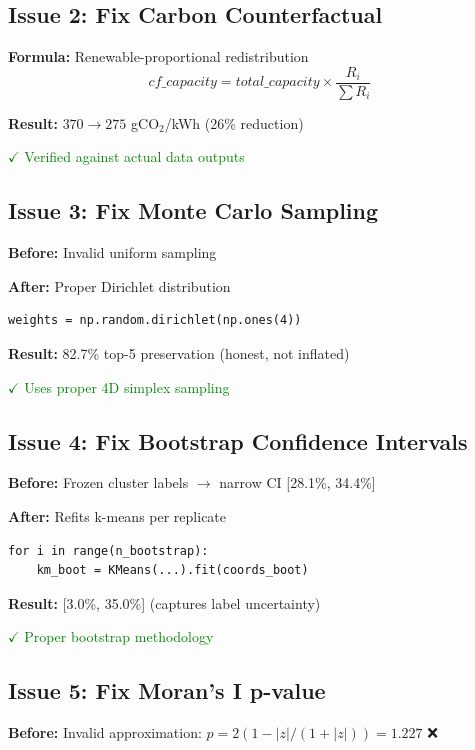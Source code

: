 \documentclass[11pt,a4paper]{article}
\begin{document}
\subsection{Issue 2: Fix Carbon Counterfactual}

\textbf{Formula:} Renewable-proportional redistribution
\[
cf\_capacity = total\_capacity \times \frac{R_i}{\sum R_i}
\]

\textbf{Result:} $370 \to 275$ gCO$_2$/kWh (26\% reduction)

\textcolor{green}{$\checkmark$ Verified against actual data outputs}

\subsection{Issue 3: Fix Monte Carlo Sampling}

\textbf{Before:} Invalid uniform sampling

\textbf{After:} Proper Dirichlet distribution
\begin{verbatim}
weights = np.random.dirichlet(np.ones(4))
\end{verbatim}

\textbf{Result:} 82.7\% top-5 preservation (honest, not inflated)

\textcolor{green}{$\checkmark$ Uses proper 4D simplex sampling}

\subsection{Issue 4: Fix Bootstrap Confidence Intervals}

\textbf{Before:} Frozen cluster labels $\to$ narrow CI {[}28.1\%, 34.4\%{]}

\textbf{After:} Refits k-means per replicate
\begin{verbatim}
for i in range(n_bootstrap):
    km_boot = KMeans(...).fit(coords_boot)
\end{verbatim}

\textbf{Result:} {[}3.0\%, 35.0\%{]} (captures label uncertainty)

\textcolor{green}{$\checkmark$ Proper bootstrap methodology}

\subsection{Issue 5: Fix Moran's I p-value}

\textbf{Before:} Invalid approximation: $p = 2(1 - |z|/(1+|z|)) = 1.227$ {\color{red}❌}
\end{document}
